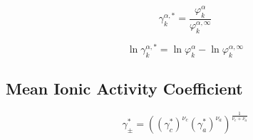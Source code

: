 \documentclass[12pt, letterpaper]{article}
\begin{document}

\begin{equation}
    \gamma_{k}^{\alpha,*}
    =
    \frac{\varphi_{k}^{\alpha}}{\varphi_{k}^{\alpha,\infty}}
    \label{eq:gamma_alpha_asym}
\end{equation}


\begin{equation}
    \ln\gamma_{k}^{\alpha,*}
    =
    \ln\varphi_{k}^{\alpha}
    -
    \ln\varphi_{k}^{\alpha,\infty}
    \label{eq:lngamma_alpha_asym}
\end{equation}

\subsection{Mean Ionic Activity Coefficient}


\begin{equation}
    \gamma_{\pm}^{*}
    =
    \left(
    \left(\gamma_{c}^{*}\right)^{\nu_{c}}
    \left(\gamma_{a}^{*}\right)^{\nu_{a}}
    \right)^{\frac{1}{\nu_{c}+\nu_{a}}}
    \label{eq:gamma_pm_asym}
\end{equation}

\end{document}
